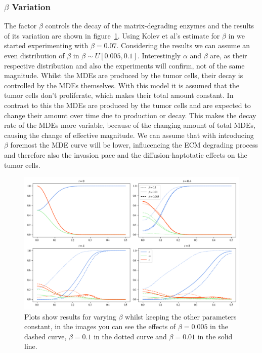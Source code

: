 \subsubsection*{$\beta$ Variation}
The factor $\beta$ controls the decay of the matrix-degrading enzymes and the results of its variation are shown in figure~\ref{fig:beta_variation}. Using Kolev et al's estimate for $\beta$ in \cite{Kolev2010} we started experimenting with $\beta=0.07$. Considering the results we can assume an even distribution of $\beta$ in $\beta \sim U[0.005, 0.1]$. Interestingly $\alpha$ and $\beta$ are, as their respective distribution and also the experiments will confirm, not of the same magnitude. Whilst the MDEs are produced by the tumor cells, their decay is controlled by the MDEs themselves. With this model it is assumed that the tumor cells don't proliferate, which makes their total amount constant. In contrast to this the MDEs are produced by the tumor cells and are expected to change their amount over time due to production or decay. This makes the decay rate of the MDEs more variable, because of the changing amount of total MDEs, causing the change of effective magnitude.\newline
We can assume that with introducing $\beta$ foremost the MDE curve will be lower, influcencing the ECM degrading process and therefore also the invasion pace and the diffusion-haptotatic effects on the tumor cells. \newline 
\begin{figure}[h]
    \centering
    \includegraphics[width=\textwidth]{resources/images/beta_variation.png}
    \caption{Plots show results for varying $\beta$ whilst keeping the other parameters constant, in the images you can see the effects of $\beta=0.005$ in the dashed curve, $\beta=0.1$ in the dotted curve and $\beta=0.01$ in the solid line.}
    \label{fig:beta_variation}
\end{figure}
